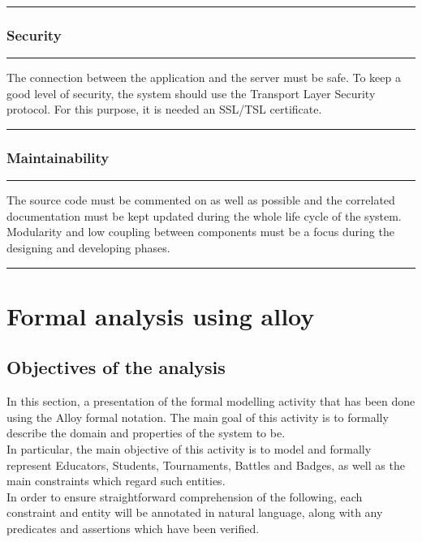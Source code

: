 \documentclass{Configuration_Files/Template}
\begin{document}
{\color{bluepoli}\rule{\linewidth}{0.1pt}}

\subsection{Security}

{\color{bluepoli}\rule{\linewidth}{0.1pt}}

The connection between the application and the server must be safe. To keep a good level of security, the system should use the Transport Layer Security protocol. For this purpose, it is needed an SSL/TSL certificate.

{\color{bluepoli}\rule{\linewidth}{0.1pt}}

\subsection{Maintainability}

{\color{bluepoli}\rule{\linewidth}{0.1pt}}

The source code must be commented on as well as possible and the correlated documentation must be kept updated during the whole life cycle of the system.\\
Modularity and low coupling between components must be a focus during the designing and developing phases.\\

{\color{bluepoli}\rule{\linewidth}{0.1pt}}

\chapter{Formal analysis using alloy}

\section{Objectives of the analysis}

In this section, a presentation of the formal modelling activity that has been done using the Alloy formal notation. The main goal of this activity is to formally describe the domain and properties of the system to be.\\
In particular, the main objective of this activity is to model and formally represent Educators, Students, Tournaments, Battles and Badges, as well as the main constraints which regard such entities.\\
In order to ensure straightforward comprehension of the following, each constraint and entity will be annotated in natural language, along with any predicates and assertions which have been verified.\\
\end{document}
